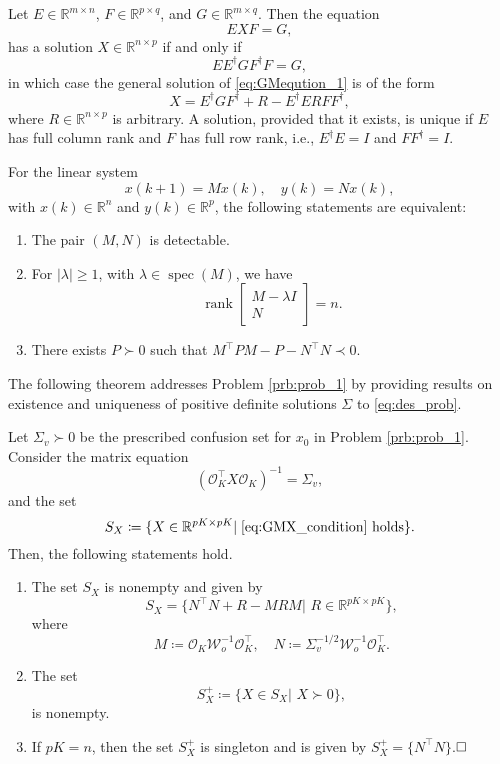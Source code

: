 \documentclass{ifacconf}
\DeclareMathOperator{\rank}{rank}
\DeclareMathOperator{\spec}{spec}
\newcommand{\calO}{\ensuremath{\mathcal{O}}}
\newcommand{\calW}{\ensuremath{\mathcal{W}}}
\newcommand{\R}{\ensuremath{\mathbb R}}
\def\be{\begin{equation}}
\def\ee{\end{equation}}
\newcommand{\bbm}{\begin{bmatrix}}
\newcommand{\ebm}{\end{bmatrix}}
\newcommand{\+}{\mathsmaller{+}}
\newcommand{\qedwhite}{\hfill \ensuremath{\Box}}
\begin{document}
\begin{lem}\cite[Theorem 13.27]{laub2005matrix}\label{lem:matrix_equation_1}
	Let $E\in \R^{m\times n}$, $F\in \R^{p\times q}$, and $G\in \R^{m\times q}$. Then the equation
	\be\label{eq:GMeqution_1}
	EXF=G,
	\ee
	has a solution $X \in \R^{n \times p}$ if and only if 
	\be \label{eq:GMuniqness}
	EE^{\dag}GF^{\dag}F = G,
	\ee 
	 in which case the general solution of \eqref{eq:GMeqution_1} is of the form
	\be\label{eq:GMsolution}
	X = E^{\dag}GF^{\dag} + R - E^{\dag}ERFF^{\dag},	
	\ee
	where $R\in \R^{n\times p}$ is arbitrary. A solution, provided that it exists, is unique if $E$ has full
	column rank and $F$ has full row rank, i.e., $E^{\dag}E = I$ and  $FF^{\dag} = I$.
\end{lem}
\begin{lem}\cite[p.192]{hespanha2018linear}\label{lem:detectability}
	For the linear system 
	\be\label{eq:fic_sys}
	 x({k+1}) = Mx({k}), \quad
	y({k}) = Nx({k}),
	\ee
	with $x({k}) \in \R^{n}$ and $y(k) \in \R^{p}$, the following statements are equivalent:
	\begin{enumerate}
		\item The pair $(M, N)$ is detectable.
		\item For  $|\lambda|\geq1$, with $\lambda \in \spec(M)$, we have
			\be\label{eq:det_second}
				\rank \bbm M-\lambda I \\ N \ebm = n.
			\ee
		\item There exists $P \succ 0$ such that $M^{\top}PM - P - N^{\top}N \prec 0$.
	\end{enumerate}
\end{lem}
The following theorem addresses Problem \ref{prb:prob_1} by providing results on existence and uniqueness of positive definite solutions $\Sigma$ to \eqref{eq:des_prob}.
%
\begin{thm}\label{thrm:sigma_exists}
	Let $\Sigma_v \succ 0$ be the prescribed confusion set for $x_0$ in Problem \ref{prb:prob_1}.
	Consider the matrix equation
	\be\label{eq:GMX_condition}
	(\calO_K^ \top X \calO_K)^{-1}= \Sigma_v,
	\ee
	and the set 
	\be\label{eq:set_X}
	S_{X} \coloneqq \{ X\in \R^{pK\times pK}| \;\eqref{eq:GMX_condition}\,\,\text{holds} \}.
	\ee
 Then, the following statements hold.
	\begin{enumerate}[label=(\emph{\roman*})]
		\item \label{item_X-exist} The set $S_X$ is nonempty and given by
		\be\label{eq:set_X_R}
			S_{X} = \{ N^{\top}N + R - MRM|\,\, R \in\R^{pK\times pK} \},
		\ee
		where  
		\be \label{eq:M_N_pair}
		M \coloneqq \calO_K\calW_o^{-1} \calO_K^ \top, \quad N \coloneqq \Sigma_v^{-1/2}\calW_o^{-1} \calO_K^ \top.
		\ee
		\item \label{item_Set_X_positive}  	The set 
		\be\label{eq:set_X_positive}
		S_X^+ \coloneqq \{X\in S_X|\,\,X\succ 0 \},
		\ee
		is nonempty.
		\item \label{item_Set_X_single} If $pK=n$, then the set $S_X^+$ is singleton and is given by $S_X^+ = \{ N^{\top}N \}$.$\qedwhite$
	\end{enumerate}
\end{thm}
\end{document}
